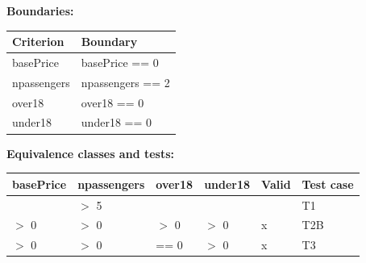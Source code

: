 \documentclass[12pt]{article}
\begin{document}
\textbf{Boundaries:}
\begin{center}
  \begin{tabular}{|l|l|}
    \hline
    Criterion & Boundary \\
    \hline
    basePrice & basePrice == 0 \\
    \hline
    npassengers & npassengers == 2 \\
    \hline
    over18 & over18 == 0 \\
    \hline
    under18 & under18 == 0 \\
    \hline
  \end{tabular}
\end{center}
\textbf{Equivalence classes and tests:}
\begin{center}
  \begin{tabular}{|l|l|l|l|l|l|}
    \hline
    basePrice & npassengers & over18 & under18 & Valid & Test case \\
    \hline
     & $>$ 5 & & & & T1 \\
     \hline
     $>$ 0 & $>$ 0 & $>$ 0 & $>$ 0 & x & T2B \\
    \hline
     $>$ 0 & $>$ 0 & == 0 & $>$ 0 & x & T3 \\
    \hline
  \end{tabular}
\end{center}







\newpage
\end{document}
